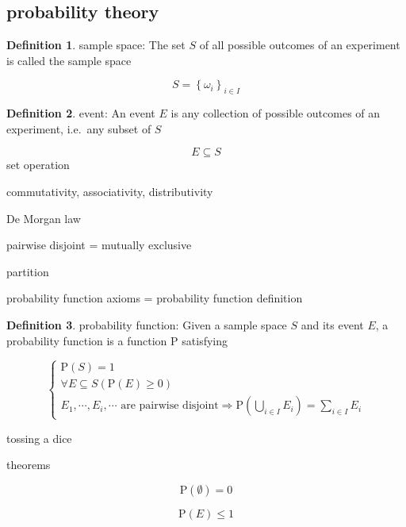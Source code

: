 \documentclass[
]{book}
\theoremstyle{definition}
\newtheorem{definition}{Definition}[chapter]
\theoremstyle{definition}
\theoremstyle{definition}
\theoremstyle{definition}
\theoremstyle{remark}
\begin{document}
\subsection{probability theory}\label{probability-theory}

\begin{definition}
\protect\hypertarget{def:unnamed-chunk-2}{}\label{def:unnamed-chunk-2}sample space: The set \(S\) of all possible outcomes of an experiment is called the sample space
\end{definition}

\[
S=\left\{ \omega_{{\scriptscriptstyle i}}\right\} _{{\scriptscriptstyle i}\in I}
\]

\begin{definition}
\protect\hypertarget{def:unnamed-chunk-3}{}\label{def:unnamed-chunk-3}event: An event \(E\) is any collection of possible outcomes of an experiment, i.e.~any subset of \(S\)
\end{definition}

\[
E \subseteq S
\]
set operation

commutativity, associativity, distributivity

De Morgan law

pairwise disjoint = mutually exclusive

partition

probability function axioms = probability function definition

\begin{definition}
\protect\hypertarget{def:unnamed-chunk-4}{}\label{def:unnamed-chunk-4}probability function: Given a sample space \(S\) and its event \(E\), a probability function is a function \(\mathrm{P}\) satisfying
\end{definition}

\[
\begin{cases}
\mathrm{P}\left(S\right)=1\\
\forall E\subseteq S\left(\mathrm{P}\left(E\right)\ge0\right)\\
E_{{\scriptscriptstyle 1}},\cdots,E_{{\scriptscriptstyle i}},\cdots\text{ are pairwise disjoint}\Rightarrow\mathrm{P}\left(\bigcup\limits _{i\in I}E_{{\scriptscriptstyle i}}\right)=\sum\limits _{i\in I}E_{{\scriptscriptstyle i}}
\end{cases}
\]

tossing a dice

theorems

\[
\mathrm{P}\left(\emptyset\right)=0
\]

\[
\mathrm{P}\left(E\right)\le1
\]
\end{document}
